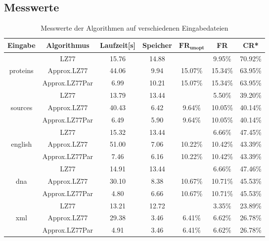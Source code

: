 \newpage
\subsection{Messwerte}

\begin{table}[ht]
    \centering
    \caption{Messwerte der Algorithmen auf verschiedenen Eingabedateien}
    \label{messwerte}
    \begin{tabular} { |c|c|c|c|c|c|c| }
        \hline
        \textbf{Eingabe} & \textbf{Algorithmus} & \textbf{Laufzeit[s]} & \textbf{Speicher} & $\mathbf{FR_{unopt}}$ & \textbf{FR} & \textbf{CR*} \\
        \hline
        & LZ77 & 15.76 & 14.88 & & 9.95\% & 70.92\% \\
        proteins & Approx.LZ77 & 44.06 & 9.94 & 15.07\% & 15.34\% & 63.95\% \\
        & Approx.LZ77Par & 6.99 & 10.21 & 15.07\% & 15.34\% & 63.95\% \\
        \hline
        & LZ77 & 13.79 & 13.44 & & 5.50\% & 39.20\% \\
        sources & Approx.LZ77 & 40.43 & 6.42 & 9.64\% & 10.05\% & 40.14\% \\
        & Approx.LZ77Par & 6.49 & 5.90 & 9.64\% & 10.05\% & 40.14\% \\
        \hline
        & LZ77 & 15.32 & 13.44 & & 6.66\% & 47.45\% \\
        english & Approx.LZ77 & 51.00 & 7.06 & 10.22\% & 10.42\% & 43.39\% \\
        & Approx.LZ77Par & 7.46 & 6.16 & 10.22\% & 10.42\% & 43.39\% \\
        \hline
        & LZ77 & 14.91 & 13.44 & & 6.66\% & 47.46\% \\
        dna & Approx.LZ77 & 30.10 & 8.38 & 10.67\% & 10.71\% & 45.53\% \\
        & Approx.LZ77Par & 4.80 & 6.66 & 10.67\% & 10.71\% & 45.53\% \\
        \hline
        & LZ77 & 13.21 & 12.72 & & 3.35\% & 23.89\% \\
        xml & Approx.LZ77 & 29.38 & 3.46 & 6.41\% & 6.62\% & 26.78\% \\
        & Approx.LZ77Par & 4.91 & 3.46 & 6.41\% & 6.62\% & 26.78\% \\
        \hline
    \end{tabular}
\end{table}


